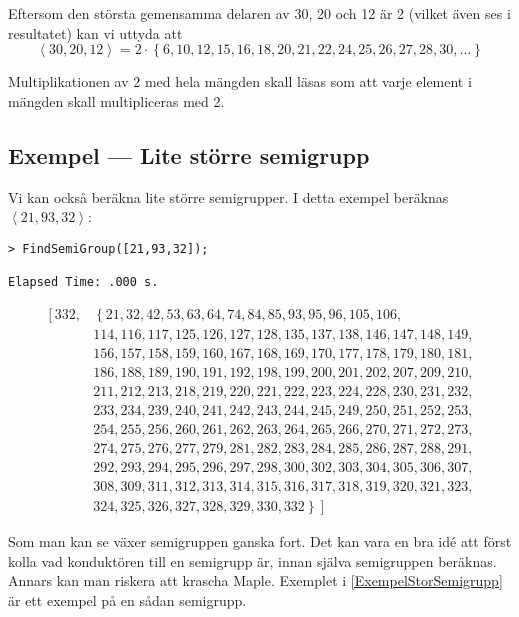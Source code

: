 Eftersom den största gemensamma delaren av 30, 20 och 12 är 2 (vilket även ses i resultatet) kan vi uttyda att
\[\left<30, 20, 12\right> = 2 \cdot \left\{6, 10, 12, 15, 16, 18, 20, 21, 22, 24, 25, 26, 27, 28, 30, \ldots\right\}\]

Multiplikationen av 2 med hela mängden skall läsas som att varje element i mängden skall multipliceras med 2.

\subsection{Exempel --- Lite större semigrupp}

Vi kan också beräkna lite större semigrupper. I detta exempel beräknas $\left<21, 93, 32\right>$:

\begin{verbatim}
> FindSemiGroup([21,93,32]);

Elapsed Time: .000 s.
\end{verbatim}
\[
\begin{array}{ll}
\left[332\right., & \left\{21, 32, 42, 53, 63, 64, 74, 84, 85, 93, 95, 96, 105, 106,\right. \\
&	114, 116, 117, 125, 126, 127, 128, 135, 137, 138, 146, 147, 148, 149,\\
&	156, 157, 158, 159, 160, 167, 168, 169, 170, 177, 178, 179, 180, 181,\\
&	186, 188, 189, 190, 191, 192, 198, 199, 200, 201, 202, 207, 209, 210,\\
&	211, 212, 213, 218, 219, 220, 221, 222, 223, 224, 228, 230, 231, 232,\\
&	233, 234, 239, 240, 241, 242, 243, 244, 245, 249, 250, 251, 252, 253,\\
&	254, 255, 256, 260, 261, 262, 263, 264, 265, 266, 270, 271, 272, 273,\\
&	274, 275, 276, 277, 279, 281, 282, 283, 284, 285, 286, 287, 288, 291,\\
&	292, 293, 294, 295, 296, 297, 298, 300, 302, 303, 304, 305, 306, 307,\\
&	308, 309, 311, 312, 313, 314, 315, 316, 317, 318, 319, 320, 321, 323,\\
&	\left.\left.324, 325, 326, 327, 328, 329, 330, 332\right\}\right]\end{array}
\]

Som man kan se växer semigruppen ganska fort. Det kan vara en bra idé att först kolla vad konduktören till en semigrupp är, innan själva semigruppen beräknas. Annars kan man riskera att krascha Maple. Exemplet i \ref{ExempelStorSemigrupp} är ett exempel på en sådan semigrupp.


